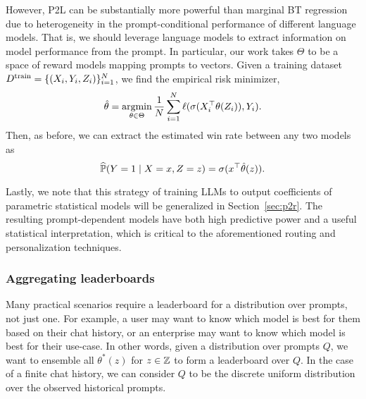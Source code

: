 However, P2L can be substantially more powerful than marginal BT regression due to heterogeneity in the prompt-conditional performance of different language models.
That is, we should leverage language models to extract information on model performance from the prompt.
In particular, our work takes $\Theta$ to be a space of reward models mapping prompts to vectors.
Given a training dataset $\Dtrain = \{(X_i,Y_i,Z_i)\}_{i=1}^N$, we find the empirical risk minimizer,
\begin{equation}
    \label{eq:p2l-bt}
    \hat\theta = \argmin_{\theta \in \Theta} \frac{1}{N}\sum\limits_{i=1}^N \ell(\sigma(X_i^\top \theta(Z_i)), Y_i).
\end{equation}
Then, as before, we can extract the estimated win rate between any two models as
\begin{equation}
    \widehat{\P}(Y = 1 \mid X = x, Z = z) = \sigma(x^{\top}\hat\theta(z)).
\end{equation}

Lastly, we note that this strategy of training LLMs to output coefficients of parametric statistical models will be generalized in Section~\ref{sec:p2r}.
The resulting prompt-dependent models have both high predictive power and a useful statistical interpretation, which is critical to the aforementioned routing and personalization techniques.

\subsubsection{Aggregating leaderboards}
\label{sec:aggregating}

Many practical scenarios require a leaderboard for a distribution over prompts, not just one.
For example, a user may want to know which model is best for them based on their chat history, or an enterprise may want to know which model is best for their use-case.
In other words, given a distribution over prompts $Q$, we want to ensemble all $\theta^*(z)$ for $z \in \Z$ to form a leaderboard over $Q$.
In the case of a finite chat history, we can consider $Q$ to be the discrete uniform distribution over the observed historical prompts.

